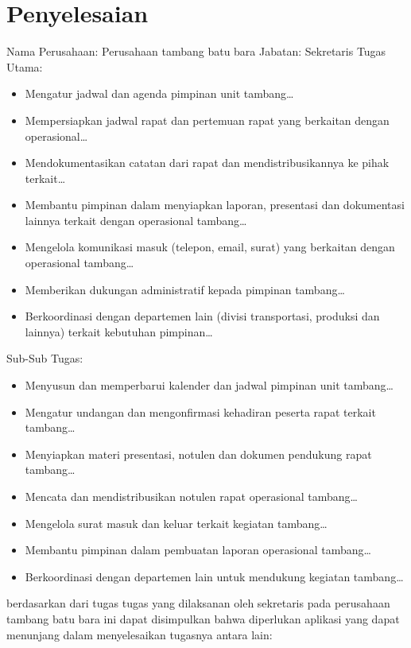 \documentclass[a4paper, 12pt]{article}
\begin{document}
\section{Penyelesaian}
Nama Perusahaan: Perusahaan tambang batu bara\newline
Jabatan: Sekretaris\newline
Tugas Utama:
\begin{itemize}
  \item Mengatur jadwal dan agenda pimpinan unit tambang\dots
  \item Mempersiapkan jadwal rapat dan pertemuan rapat yang berkaitan dengan operasional\dots
  \item Mendokumentasikan catatan dari rapat dan mendistribusikannya ke pihak terkait\dots
  \item Membantu pimpinan dalam menyiapkan laporan, presentasi dan dokumentasi lainnya terkait dengan operasional tambang\dots
  \item Mengelola komunikasi masuk (telepon, email, surat) yang berkaitan dengan operasional tambang\dots
  \item Memberikan dukungan administratif kepada pimpinan tambang\dots
  \item Berkoordinasi dengan departemen lain (divisi transportasi, produksi dan lainnya) terkait kebutuhan pimpinan\dots
\end{itemize}
Sub-Sub Tugas:
\begin{itemize}
  \item Menyusun dan memperbarui kalender dan jadwal pimpinan unit tambang\dots
  \item Mengatur undangan dan mengonfirmasi kehadiran peserta rapat terkait tambang\dots
  \item Menyiapkan materi presentasi, notulen dan dokumen pendukung rapat tambang\dots
  \item Mencata dan mendistribusikan notulen rapat operasional tambang\dots
  \item Mengelola surat masuk dan keluar terkait kegiatan tambang\dots
  \item Membantu pimpinan dalam pembuatan laporan operasional tambang\dots
  \item Berkoordinasi dengan departemen lain untuk mendukung kegiatan tambang\dots
\end{itemize}
berdasarkan dari tugas tugas yang dilaksanan oleh sekretaris pada perusahaan tambang batu bara ini dapat disimpulkan bahwa diperlukan aplikasi yang dapat menunjang dalam menyelesaikan tugasnya antara lain:
\end{document}
